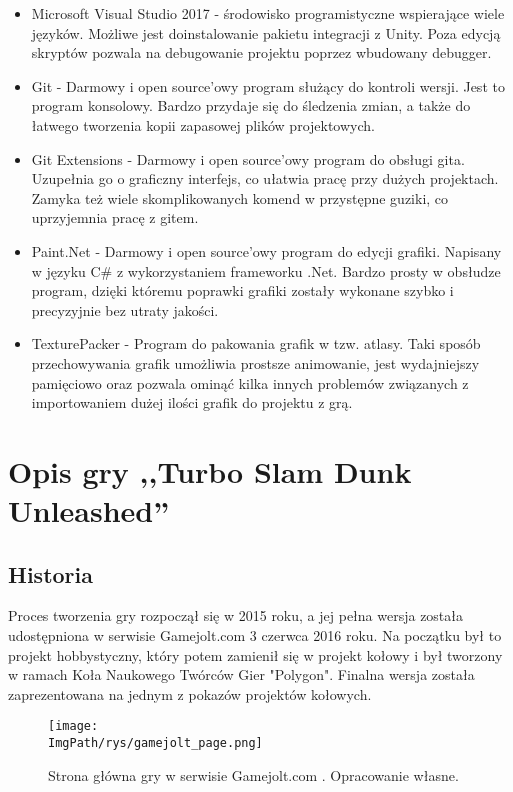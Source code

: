 \documentclass[a4paper,12pt,twoside,openany]{report}
\newcommand{\ImgPath}{.}
\begin{document}
\begin{itemize}
    \item Microsoft Visual Studio 2017 - środowisko programistyczne wspierające wiele języków. Możliwe jest doinstalowanie pakietu integracji z Unity. Poza edycją skryptów pozwala na debugowanie projektu poprzez wbudowany debugger.
    \item Git - Darmowy i open source'owy program służący do kontroli wersji. Jest to program konsolowy. Bardzo przydaje się do śledzenia zmian, a także do łatwego tworzenia kopii zapasowej plików projektowych.
    \item Git Extensions - Darmowy i open source'owy program do obsługi gita. Uzupełnia go o graficzny interfejs, co ułatwia pracę przy dużych projektach. Zamyka też wiele skomplikowanych komend w przystępne guziki, co uprzyjemnia pracę z gitem.
    \item Paint.Net - Darmowy i open source'owy program do edycji grafiki. Napisany w języku C\# z wykorzystaniem frameworku .Net. Bardzo prosty w obsłudze program, dzięki któremu poprawki grafiki zostały wykonane szybko i precyzyjnie bez utraty jakości.
    \item TexturePacker - Program do pakowania grafik w tzw. atlasy. Taki sposób przechowywania grafik umożliwia prostsze animowanie, jest wydajniejszy pamięciowo oraz pozwala ominąć kilka innych problemów związanych z importowaniem dużej ilości grafik do projektu z grą.
\end{itemize}

\chapter{Opis gry ,,Turbo Slam Dunk Unleashed''}

\section{Historia}

Proces tworzenia gry rozpoczął się w 2015 roku, a jej pełna wersja została udostępniona w serwisie Gamejolt.com 3 czerwca 2016 roku\cite{gamejolt_page}. Na początku był to projekt hobbystyczny, który potem zamienił się w projekt kołowy i był tworzony w ramach Koła Naukowego Twórców Gier "Polygon". Finalna wersja została zaprezentowana na jednym z pokazów projektów kołowych.
\begin{figure}[!htbp]
	\begin{center}
\centering
\texttt{[image: \\ImgPath/rys/gamejolt\_page.png]}
\end{center}
	\caption{Strona główna gry w serwisie Gamejolt.com . Opracowanie własne.}
	\label{gamejolt_page}
\end{figure}
\end{document}
